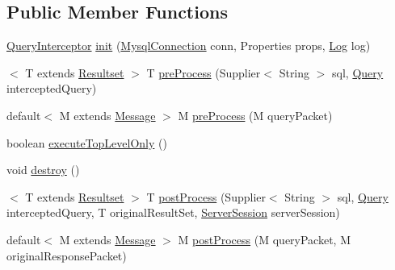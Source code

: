 \subsection*{Public Member Functions}
\begin{DoxyCompactItemize}
\item 
\mbox{\hyperlink{interfacecom_1_1mysql_1_1cj_1_1interceptors_1_1_query_interceptor}{Query\+Interceptor}} \mbox{\hyperlink{interfacecom_1_1mysql_1_1cj_1_1interceptors_1_1_query_interceptor_a1613f5491fdb4610d5727d60c904e7e2}{init}} (\mbox{\hyperlink{interfacecom_1_1mysql_1_1cj_1_1_mysql_connection}{Mysql\+Connection}} conn, Properties props, \mbox{\hyperlink{interfacecom_1_1mysql_1_1cj_1_1log_1_1_log}{Log}} log)
\item 
$<$ T extends \mbox{\hyperlink{interfacecom_1_1mysql_1_1cj_1_1protocol_1_1_resultset}{Resultset}} $>$ T \mbox{\hyperlink{interfacecom_1_1mysql_1_1cj_1_1interceptors_1_1_query_interceptor_a029f3c5ddf1f6cc28252db82c1ff7e5c}{pre\+Process}} (Supplier$<$ String $>$ sql, \mbox{\hyperlink{interfacecom_1_1mysql_1_1cj_1_1_query}{Query}} intercepted\+Query)
\item 
default$<$ M extends \mbox{\hyperlink{interfacecom_1_1mysql_1_1cj_1_1protocol_1_1_message}{Message}} $>$ M \mbox{\hyperlink{interfacecom_1_1mysql_1_1cj_1_1interceptors_1_1_query_interceptor_ada6b2326b706e992daf61f897652b971}{pre\+Process}} (M query\+Packet)
\item 
boolean \mbox{\hyperlink{interfacecom_1_1mysql_1_1cj_1_1interceptors_1_1_query_interceptor_ab12edf90713df907ba400dbe3ba03ea6}{execute\+Top\+Level\+Only}} ()
\item 
void \mbox{\hyperlink{interfacecom_1_1mysql_1_1cj_1_1interceptors_1_1_query_interceptor_a123809a91800f4f4409f5f37717bf9c8}{destroy}} ()
\item 
$<$ T extends \mbox{\hyperlink{interfacecom_1_1mysql_1_1cj_1_1protocol_1_1_resultset}{Resultset}} $>$ T \mbox{\hyperlink{interfacecom_1_1mysql_1_1cj_1_1interceptors_1_1_query_interceptor_acd2344550559d32789873afcd3d54cc0}{post\+Process}} (Supplier$<$ String $>$ sql, \mbox{\hyperlink{interfacecom_1_1mysql_1_1cj_1_1_query}{Query}} intercepted\+Query, T original\+Result\+Set, \mbox{\hyperlink{interfacecom_1_1mysql_1_1cj_1_1protocol_1_1_server_session}{Server\+Session}} server\+Session)
\item 
default$<$ M extends \mbox{\hyperlink{interfacecom_1_1mysql_1_1cj_1_1protocol_1_1_message}{Message}} $>$ M \mbox{\hyperlink{interfacecom_1_1mysql_1_1cj_1_1interceptors_1_1_query_interceptor_a08ee8ceeb494eb8f33d2f18a9471e8d1}{post\+Process}} (M query\+Packet, M original\+Response\+Packet)
\end{DoxyCompactItemize}


